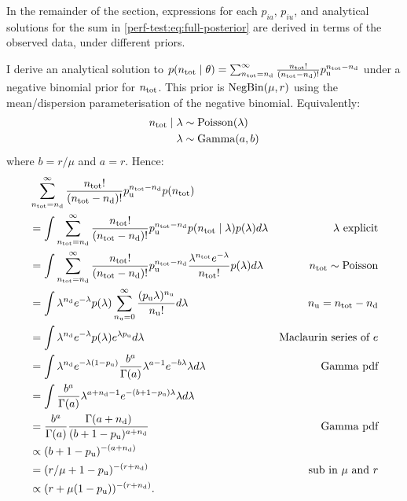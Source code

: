 \documentclass[thesis.tex]{subfiles}
\begin{document}
In the remainder of the section, expressions for each $p_{ia}$, $p_{iu}$, and analytical solutions for the sum in \cref{perf-test:eq:full-posterior} are derived in terms of the observed data, under different priors.

I derive an analytical solution to $p(n_\text{tot} \mid \theta) = \sum_{n_\text{tot}=n_\text{d}}^\infty \frac{n_\text{tot}!}{(n_\text{tot} - n_\text{d})!} p_\text{u}^{n_\text{tot} - n_\text{d}}$ under a negative binomial prior for $n_\text{tot}$.
This prior is $\operatorname{NegBin}(\mu, r)$ using the mean/dispersion parameterisation of the negative binomial.
Equivalently:
\begin{align}
n_\text{tot} \mid \lambda &\sim \operatorname{Poisson}(\lambda) \\
\lambda &\sim \operatorname{Gamma}(a, b)
\end{align}
where $b = r / \mu$ and $a = r$.
Hence:
\begin{align}
&\sum_{n_\text{tot}=n_\text{d}}^\infty \frac{n_\text{tot}!}{(n_\text{tot}-n_\text{d})!} p_\text{u}^{n_\text{tot}-n_\text{d}} p(n_\text{tot}) \\
&= \int \sum_{n_\text{tot}=n_\text{d}}^\infty \frac{n_\text{tot}!}{(n_\text{tot}-n_\text{d})!} p_\text{u}^{n_\text{tot}-n_\text{d}} p(n_\text{tot} \mid \lambda) p(\lambda) d\lambda &\text{$\lambda$ explicit}\\
&= \int \sum_{n_\text{tot}=n_\text{d}}^\infty \frac{n_\text{tot}!}{(n_\text{tot}-n_\text{d})!} p_\text{u}^{n_\text{tot}-n_\text{d}} \frac{\lambda^{n_\text{tot}} e^{-\lambda}}{n_\text{tot}!} p(\lambda) d\lambda &n_\text{tot} \sim \operatorname{Poisson}\\
&= \int \lambda^{n_\text{d}} e^{-\lambda} p(\lambda) \sum_{n_\text{u}=0}^\infty \frac{(p_\text{u} \lambda)^{n_\text{u}}}{n_\text{u}!} d\lambda &n_\text{u} = n_\text{tot}-n_\text{d}\\
&= \int \lambda^{n_\text{d}} e^{-\lambda} p(\lambda) e^{\lambda p_\text{u}} d\lambda &\text{Maclaurin series of $e$} \\
&= \int \lambda^{n_\text{d}} e^{-\lambda(1 - p_\text{u})} \frac{b^a}{\Gamma(a)} \lambda^{a-1} e^{-b\lambda} \lambda d\lambda &\text{Gamma pdf}\\
&= \int \frac{b^a}{\Gamma(a)} \lambda^{a+n_\text{d}-1} e^{-(b+1-p_\text{u})\lambda} \lambda d\lambda \\
&= \frac{b^a}{\Gamma(a)} \frac{\Gamma(a+n_\text{d})}{(b+1-p_\text{u})^{a+n_\text{d}}} &\text{Gamma pdf}\\
&\propto (b+1-p_\text{u})^{-(a+n_\text{d})} \\
&= (r/\mu + 1 - p_\text{u})^{-(r+n_\text{d})} &\text{sub in $\mu$ and $r$}\\
&\propto(r + \mu (1- p_\text{u}))^{-(r+n_\text{d})}.
\end{align}
\end{document}
